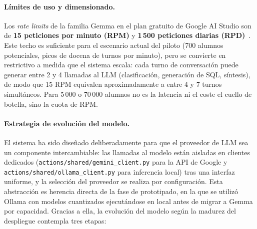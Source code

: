 \paragraph{Límites de uso y dimensionado.} Los \textit{rate limits} de la familia Gemma en el plan gratuito de Google AI Studio son de \textbf{15 peticiones por minuto (RPM)} y \textbf{1\,500 peticiones diarias (RPD)}~\cite{geminiRateLimits}. Este techo es suficiente para el escenario actual del piloto (700 alumnos potenciales, picos de docena de turnos por minuto), pero se convierte en restrictivo a medida que el sistema escala: cada turno de conversación puede generar entre 2 y 4 llamadas al LLM (clasificación, generación de SQL, síntesis), de modo que 15 RPM equivalen aproximadamente a entre 4 y 7 turnos simultáneos. Para 5\,000 o 70\,000 alumnos no es la latencia ni el coste el cuello de botella, sino la cuota de RPM.

\paragraph{Estrategia de evolución del modelo.} El sistema ha sido diseñado deliberadamente para que el proveedor de LLM sea un componente intercambiable: las llamadas al modelo están aisladas en clientes dedicados (\texttt{actions/shared/gemini\_client.py} para la API de Google y \texttt{actions/shared/ollama\_client.py} para inferencia local) tras una interfaz uniforme, y la selección del proveedor se realiza por configuración. Esta abstracción es herencia directa de la fase de prototipado, en la que se utilizó Ollama con modelos cuantizados ejecutándose en local antes de migrar a Gemma por capacidad. Gracias a ella, la evolución del modelo según la madurez del despliegue contempla tres etapas:

